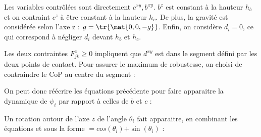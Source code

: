 			Les variables contrôlées sont directement $c^{xy}, b^{xy}$. $b^z$ est constant à la hauteur $h_b$ et on contraint $c^z$ à être constant à la hauteur $h_c$.
			De plus, la gravité est considérée selon l'axe z : $g=\tr{\mat{0, 0, -g}}$. Enfin, on considère $d_i=0$, ce qui correspond à négliger $d_i$ devant $h_b$ et $h_c$.
			
			
			Les deux contraintes $ F^z_{jk} \ge 0$ impliquent que $d^{xy}$ est dans le segment défini par les deux points de contact. 
			Pour assurer le maximum de robustesse, on choisi de contraindre le CoP au centre du segment :
			
			On peut donc réécrire les équations précédente pour faire apparaitre la dynamique de $\psi_i$ par rapport à celles de $b$ et $c$ :
			
			Un rotation autour de l'axe $z$ de l'angle $\theta_i$ fait apparaitre, en combinant les équations  et  sous la forme  $=cos(\theta_i)$$+\sin(\theta_i)$ :
